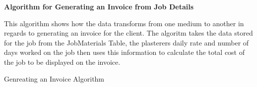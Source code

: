 \textbf{Algorithm for Generating an Invoice from Job Details}
\begin{flushleft}
This algorithm shows how the data transforms from one medium to another in regards to generating an invoice for the client. The algoritm takes the data stored for the job from the JobMaterials Table, the plasterers daily rate and number of days worked on the job then uses this information to calculate the total cost of the job to be displayed on the invoice.
\end{flushleft}
\begin{algorithm}[H]
\label{fig:generating_an_invoice_example}
\caption{Genreating an Invoice Algorithm}
\begin{algorithmic}[1]
	\State
	\State
		\State
		\State
	\EndFor
	\State
	\State
\EndFunction




\end{algorithmic}
\end{algorithm}




\pagebreak
